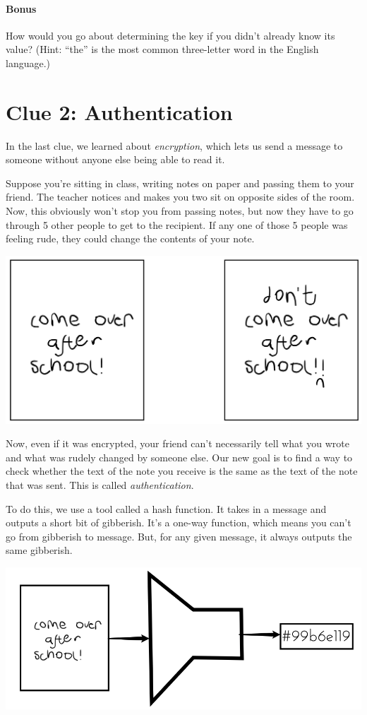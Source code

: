 \documentclass{article}
\begin{document}
\paragraph{Bonus} How would you go about determining the key if you didn't already know its value? (Hint: ``the'' is the most common three-letter word in the English language.)

\newpage

\section*{Clue 2: Authentication}

In the last clue, we learned about \textit{encryption}, which lets us send a message to someone without anyone else being able to read it. 

Suppose you're sitting in class, writing notes on paper and passing them to your friend. The teacher notices and makes you two sit on opposite sides of the room. Now, this obviously won't stop you from passing notes, but now they have to go through 5 other people to get to the recipient. If any one of those 5 people was feeling rude, they could change the contents of your note.

\begin{minipage}{\textwidth}
\centering
\includegraphics[width=.6\textwidth]{tampered}
\end{minipage}

Now, even if it was encrypted, your friend can't necessarily tell what you wrote and what was rudely changed by someone else. Our new goal is to find a way to check whether the text of the note you receive is the same as the text of the note that was sent. This is called \textit{authentication}.

To do this, we use a tool called a hash function. It takes in a message and outputs a short bit of gibberish. It's a one-way function, which means you can't go from gibberish to message. But, for any given message, it always outputs the same gibberish. 

\begin{minipage}{\textwidth}
\centering
\includegraphics[width=.7\textwidth]{hash}
\end{minipage}
\end{document}
